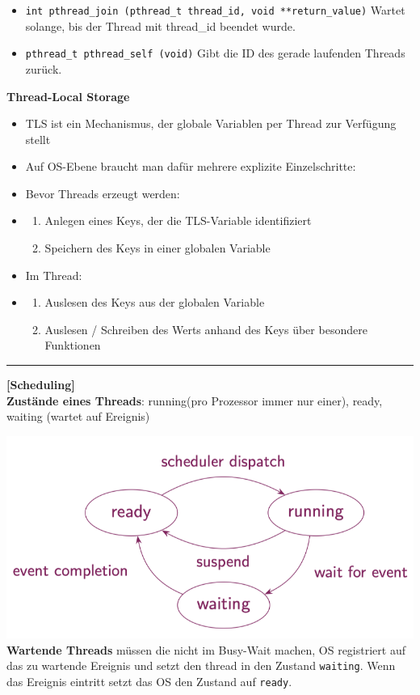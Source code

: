 \documentclass[8pt]{extarticle}
\let\oldtextbf\textbf
\renewcommand{\textbf}{\tiny\oldtextbf}
\begin{document}
\begin{multicols*}{5}
\begin{itemize} [noitemsep, topsep=0pt, leftmargin=*]
		\item \texttt{int pthread\_join (pthread\_t thread\_id, void **return\_value)} Wartet solange, bis der Thread mit thread\_id beendet wurde.
		\item \texttt{pthread\_t pthread\_self (void)} Gibt die ID des gerade laufenden Threads zurück.
	\end{itemize}
	\vspace{5pt}
	\textbf{Thread-Local Storage}
	\begin{itemize} [noitemsep, topsep=0pt, leftmargin=*]
		\item TLS ist ein Mechanismus, der globale Variablen per Thread zur Verfügung stellt
		\item Auf OS-Ebene braucht man dafür mehrere explizite Einzelschritte:
		\item Bevor Threads erzeugt werden:
		\item \begin{enumerate}[noitemsep, topsep=0pt, leftmargin=*]
		\item Anlegen eines Keys, der die TLS-Variable identifiziert
		\item Speichern des Keys in einer globalen Variable
		\end{enumerate}
		\item Im Thread:
		\item \begin{enumerate}[noitemsep, topsep=0pt, leftmargin=*]
		\item Auslesen des Keys aus der globalen Variable
		\item Auslesen / Schreiben des Werts anhand des Keys über besondere Funktionen
		\end{enumerate}	
	\end{itemize}
	
	\vspace{5pt}
	
	\rule{\linewidth}{0.4pt}
	\textbf{[Scheduling]}\\
	
	\textbf{Zustände eines Threads}: running(pro Prozessor immer nur einer), ready, waiting (wartet auf Ereignis)
	
	\includegraphics[scale=0.32]{Thread_Grundmodell.png}
	\textbf{Wartende Threads} müssen die nicht im Busy-Wait machen, OS registriert auf das zu wartende Ereignis und setzt den thread in den Zustand \texttt{waiting}. Wenn das Ereignis eintritt setzt das OS den Zustand auf \texttt{ready}.\\


\end{multicols*}
\end{document}
